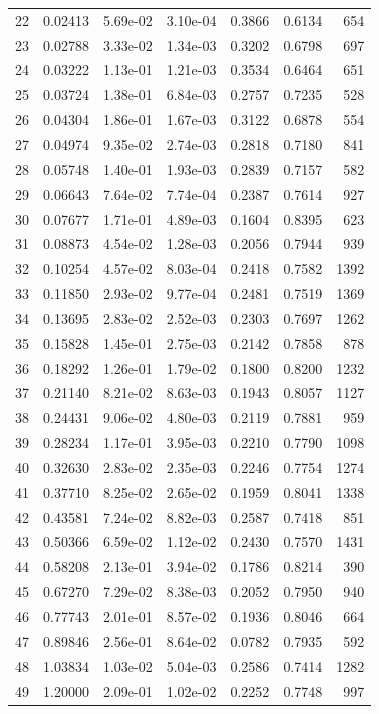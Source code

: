 {\begin{longtable}{rrrrrrr}
22 & 0.02413 & 5.69e-02 & 3.10e-04 & 0.3866 & 0.6134 & 654 \\
23 & 0.02788 & 3.33e-02 & 1.34e-03 & 0.3202 & 0.6798 & 697 \\
24 & 0.03222 & 1.13e-01 & 1.21e-03 & 0.3534 & 0.6464 & 651 \\
25 & 0.03724 & 1.38e-01 & 6.84e-03 & 0.2757 & 0.7235 & 528 \\
26 & 0.04304 & 1.86e-01 & 1.67e-03 & 0.3122 & 0.6878 & 554 \\
27 & 0.04974 & 9.35e-02 & 2.74e-03 & 0.2818 & 0.7180 & 841 \\
28 & 0.05748 & 1.40e-01 & 1.93e-03 & 0.2839 & 0.7157 & 582 \\
29 & 0.06643 & 7.64e-02 & 7.74e-04 & 0.2387 & 0.7614 & 927 \\
30 & 0.07677 & 1.71e-01 & 4.89e-03 & 0.1604 & 0.8395 & 623 \\
31 & 0.08873 & 4.54e-02 & 1.28e-03 & 0.2056 & 0.7944 & 939 \\
32 & 0.10254 & 4.57e-02 & 8.03e-04 & 0.2418 & 0.7582 & 1392 \\
33 & 0.11850 & 2.93e-02 & 9.77e-04 & 0.2481 & 0.7519 & 1369 \\
34 & 0.13695 & 2.83e-02 & 2.52e-03 & 0.2303 & 0.7697 & 1262 \\
35 & 0.15828 & 1.45e-01 & 2.75e-03 & 0.2142 & 0.7858 & 878 \\
36 & 0.18292 & 1.26e-01 & 1.79e-02 & 0.1800 & 0.8200 & 1232 \\
37 & 0.21140 & 8.21e-02 & 8.63e-03 & 0.1943 & 0.8057 & 1127 \\
38 & 0.24431 & 9.06e-02 & 4.80e-03 & 0.2119 & 0.7881 & 959 \\
39 & 0.28234 & 1.17e-01 & 3.95e-03 & 0.2210 & 0.7790 & 1098 \\
40 & 0.32630 & 2.83e-02 & 2.35e-03 & 0.2246 & 0.7754 & 1274 \\
41 & 0.37710 & 8.25e-02 & 2.65e-02 & 0.1959 & 0.8041 & 1338 \\
42 & 0.43581 & 7.24e-02 & 8.82e-03 & 0.2587 & 0.7418 & 851 \\
43 & 0.50366 & 6.59e-02 & 1.12e-02 & 0.2430 & 0.7570 & 1431 \\
44 & 0.58208 & 2.13e-01 & 3.94e-02 & 0.1786 & 0.8214 & 390 \\
45 & 0.67270 & 7.29e-02 & 8.38e-03 & 0.2052 & 0.7950 & 940 \\
46 & 0.77743 & 2.01e-01 & 8.57e-02 & 0.1936 & 0.8046 & 664 \\
47 & 0.89846 & 2.56e-01 & 8.64e-02 & 0.0782 & 0.7935 & 592 \\
48 & 1.03834 & 1.03e-02 & 5.04e-03 & 0.2586 & 0.7414 & 1282 \\
49 & 1.20000 & 2.09e-01 & 1.02e-02 & 0.2252 & 0.7748 & 997 \\
\bottomrule
\end{longtable}}

